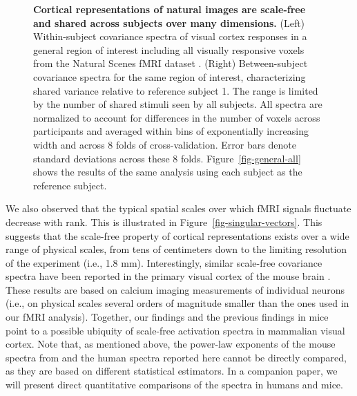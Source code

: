 \documentclass[10pt]{article}
\begin{document}
\begin{figure}


\caption{\label{fig-general}\textbf{Cortical representations of natural
images are scale-free and shared across subjects over many dimensions.}
(Left) Within-subject covariance spectra of visual cortex responses in a
general region of interest including all visually responsive voxels from
the Natural Scenes fMRI dataset \autocite{Allen2021}. (Right)
Between-subject covariance spectra for the same region of interest,
characterizing shared variance relative to reference subject 1. The
range is limited by the number of shared stimuli seen by all subjects.
All spectra are normalized to account for differences in the number of
voxels across participants and averaged within bins of exponentially
increasing width and across 8 folds of cross-validation. Error bars
denote standard deviations across these 8 folds.
Figure~\ref{fig-general-all} shows the results of the same analysis
using each subject as the reference subject.}

\end{figure}%

We also observed that the typical spatial scales over which fMRI signals
fluctuate decrease with rank. This is illustrated in
Figure~\ref{fig-singular-vectors}. This suggests that the scale-free
property of cortical representations exists over a wide range of
physical scales, from tens of centimeters down to the limiting
resolution of the experiment (i.e., 1.8 mm). Interestingly, similar
scale-free covariance spectra have been reported in the primary visual
cortex of the mouse brain \autocite{Stringer2019}. These results are
based on calcium imaging measurements of individual neurons (i.e., on
physical scales several orders of magnitude smaller than the ones used
in our fMRI analysis). Together, our findings and the previous findings
in mice point to a possible ubiquity of scale-free activation spectra in
mammalian visual cortex. Note that, as mentioned above, the power-law
exponents of the mouse spectra from \textcite{Stringer2019} and the
human spectra reported here cannot be directly compared, as they are
based on different statistical estimators. In a companion paper, we will
present direct quantitative comparisons of the spectra in humans and
mice.
\end{document}
